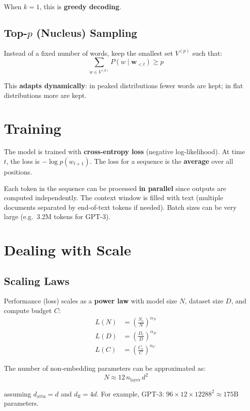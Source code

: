 \documentclass[main.tex]{subfiles}
\begin{document}
When $k = 1$, this is \textbf{greedy decoding}.

\subsection{Top-$p$ (Nucleus) Sampling}

Instead of a fixed number of words, keep the smallest set $V^{(p)}$ such that:
$$\sum_{w \in V^{(p)}} P(w \mid \mathbf{w}_{<t}) \geq p \tag{8.48}$$

This \textbf{adapts dynamically}: in peaked distributions fewer words are kept; in flat distributions more are kept.

\section{Training}

The model is trained with \textbf{cross-entropy loss} (negative log-likelihood). At time $t$, the loss is $-\log p(w_{t+1})$. The loss for a sequence is the \textbf{average} over all positions.

Each token in the sequence can be processed \textbf{in parallel} since outputs are computed independently. The context window is filled with text (multiple documents separated by end-of-text tokens if needed). Batch sizes can be very large (e.g.\ 3.2M tokens for GPT-3).

\section{Dealing with Scale}

\subsection{Scaling Laws}

Performance (loss) scales as a \textbf{power law} with model size $N$, dataset size $D$, and compute budget $C$:
\begin{align}
L(N) &= \left(\frac{N_c}{N}\right)^{\alpha_N} \tag{8.49} \\[6pt]
L(D) &= \left(\frac{D_c}{D}\right)^{\alpha_D} \tag{8.50} \\[6pt]
L(C) &= \left(\frac{C_c}{C}\right)^{\alpha_C} \tag{8.51}
\end{align}

The number of non-embedding parameters can be approximated as:
$$\boxed{N \approx 12 \, n_{\text{layer}} \, d^2} \tag{8.52}$$

assuming $d_{\text{attn}} = d$ and $d_{\text{ff}} = 4d$. For example, GPT-3: $96 \times 12 \times 12288^2 \approx 175\text{B}$ parameters.
\end{document}
